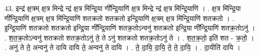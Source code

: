 \documentclass[17pt]{extarticle}
\begin{document}
43. इन्द्र॑ क्ष॒त्रम् क्ष॒त्र मिन्द्रे न्द्र॑ क्ष॒त्र मि॑न्द्रि॒या णी᳚न्द्रि॒याणि॑ क्ष॒त्र मिन्द्रे न्द्र॑ क्ष॒त्र मि॑न्द्रि॒याणि॑ । . क्ष॒त्र मि॑न्द्रि॒या णी᳚न्द्रि॒याणि॑ क्ष॒त्रम् क्ष॒त्र मि॑न्द्रि॒याणि॑ शतक्रतो शतक्रतो इन्द्रि॒याणि॑ क्ष॒त्रम् क्ष॒त्र मि॑न्द्रि॒याणि॑ शतक्रतो । . इ॒न्द्रि॒याणि॑ शतक्रतो शतक्रतो इन्द्रि॒या णी᳚न्द्रि॒याणि॑ शतक्र॒तोऽन्वनु॑ शतक्रतो इन्द्रि॒या णी᳚न्द्रि॒याणि॑ शतक्र॒तोऽनु॑ । . श॒त॒क्र॒तोऽन्वनु॑ शतक्रतो शतक्र॒तोऽनु॑ ते॒ ते ऽनु॑ शतक्रतो शतक्र॒तोऽनु॑ ते । . श॒त॒क्र॒तो॒ इति॑ शत - क्र॒तो॒ । . अनु॑ ते ते॒ अन्वनु॑ ते दायि दायि ते॒ अन्वनु॑ ते दायि । . ते॒ दा॒यि॒ दा॒यि॒ ते॒ ते॒ दा॒यि॒ । . दा॒यीति॑ दायि । \newline
\pagebreak
\end{document}
